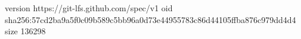 version https://git-lfs.github.com/spec/v1
oid sha256:57cd2ba9a5f0c09b589c5bb96a0d73e44955783c86d44105ffba876c979dd4d4
size 136298
